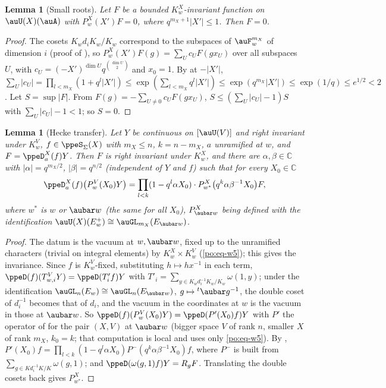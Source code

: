 \documentclass[10pt]{amsart}
\newtheorem{lemma}[theorem]{Lemma}
\theoremstyle{definition}
\theoremstyle{remark}
\newcommand{\C}{\mathbb C}
\begin{document}
\begin{lemma}[Small roots]\label{ppe:small}
Let $F$ be a bounded $K^X_w$-invariant function on $\auU(X)(\auA)$ with $P^X_w(X')F=0$, where
$q^{m_X+1}|X'|\le1$. Then $F=0$.
\end{lemma}
\begin{proof}
The cosets $K_wd_iK_w/K_w$ correspond to the subspaces of $\auF_w^{m_X}$ of dimension $i$ (proof
of {\cite[Lemma~6.8]{P49}}), so $P^X_w(X')F(g)=\sum_{U}c_UF(gx_U)$ over all subspaces $U$, with
$c_U=(-X')^{\dim U}q^{\binom{\dim U}2}$ and $x_0=1$. By {\cite[(65)]{P49}} at $-|X'|$,
$\sum_U|c_U|=\prod_{l<m_X}(1+q^l|X'|)\le\exp(\sum_{l<m_X}q^l|X'|)\le\exp(q^{m_X}|X'|)\le
\exp(1/q)\le e^{1/2}<2$. Let $S=\sup|F|$. From $F(g)=-\sum_{U\ne0}c_UF(gx_U)$,
$S\le(\sum_U|c_U|-1)S$ with $\sum_U|c_U|-1<1$; so $S=0$.
\end{proof}

\begin{lemma}[Hecke transfer]\label{ppe:transfer}
Let $Y$ be continuous on $[\auU(V)]$ and right invariant under $K^V_w$, $f\in\ppeS_\Sigma(X)$ with
$m_X\le n$, $k=n-m_X$, $a$ unramified at $w$, and $F=\ppeD^X_a(f)Y$. Then $F$ is right invariant
under $K^X_w$, and there are $\alpha,\beta\in\C$ with $|\alpha|=q^{m_X/2}$, $|\beta|=q^{n/2}$
(independent of $Y$ and $f$) such that for every $X_0\in\C$
\[
\ppeD^X_a(f)\bigl(P^V_w(X_0)Y\bigr)=\prod_{l<k}(1-q^l\alpha X_0)\cdot P^X_{w^\ast}\bigl(q^k\alpha
\beta^{-1}X_0\bigr)F,
\]
where $w^\ast$ is $w$ or $\aubar w$ (the same for all $X_0$), $P^X_{\aubar w}$ being defined with the
identification $\auU(X)(E^+_w)\cong\auGL_{m_X}(E_{\aubar w})$.
\end{lemma}
\begin{proof}
The datum is the vacuum at $w,\aubar w$, fixed up to the unramified characters (trivial on
integral elements) by $K^X_w\times K^V_w$ (\eqref{po:eq-w5}); this gives the invariance. Since
$f$ is $K^V_w$-fixed, substituting $h\mapsto hx^{-1}$ in each term,
$\ppeD(f)(T^V_{w,i}Y)=\ppeD(T'_if)Y$ with $T'_i=\sum_{y\in K_wd_i^{-1}K_w/K_w}\omega(1,y)$; under the
identification $\auGL_n(E_w)\cong\auGL_n(E_{\aubar w})$, $g\mapsto{}^t\aubar g^{-1}$, the double coset
of $d_i^{-1}$ becomes that of $d_i$, and the vacuum in the coordinates at $w$ is the vacuum in those
at $\aubar w$. So $\ppeD(f)(P^V_w(X_0)Y)=\ppeD(P'(X_0)f)Y$ with $P'$ the operator of
{\cite[Lemma~6.8]{P49}} for the pair $(X,V)$ at $\aubar w$ (bigger space $V$ of rank $n$, smaller $X$
of rank $m_X$, $k_0=k$; that computation is local and uses only \eqref{po:eq-w5}). By
{\cite[Lemma~6.8]{P49}}, $P'(X_0)f=\prod_{l<k}(1-q^l\alpha X_0)P^-(q^k\alpha\beta^{-1}X_0)f$, where
$P^-$ is built from $\sum_{g\in K d_i^{-1}K/K}\omega(g,1)$; and $\ppeD(\omega(g,1)f)Y=R_gF$. Translating
the double cosets back gives $P^X_{w^\ast}$.
\end{proof}
\end{document}
